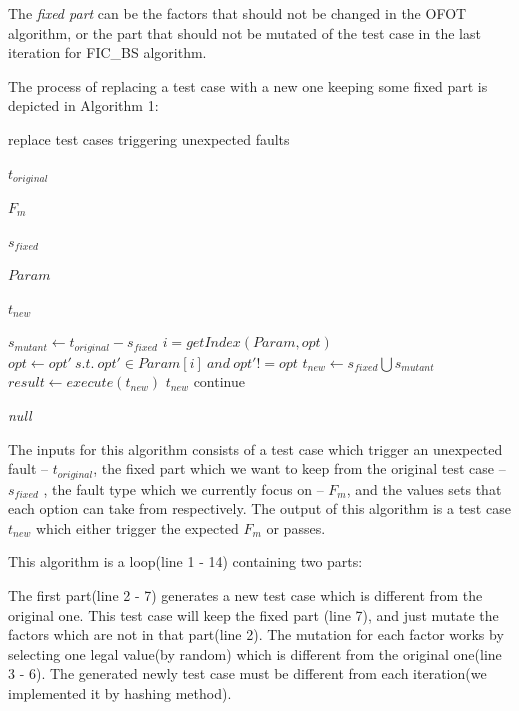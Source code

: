 \documentclass{sig-alternate}
\begin{document}
The \emph{fixed part} can be the factors that should not be changed in the OFOT algorithm, or the part that should not be mutated of the test case in the last iteration for FIC\_BS algorithm.

The process of replacing a test case with a new one keeping some fixed part is depicted in Algorithm 1:

\begin{algorithm}
  \caption{replace test cases triggering unexpected faults}
  \begin{algorithmic}[1]
     \Require

     $t_{original}$ 

     $F_{m}$ 

     $s_{fixed}$ 

     $Param$ 


     \Ensure  $t_{new}$ 

       \State $s_{mutant} \leftarrow t_{original} - s_{fixed}$
          \State $i = getIndex(Param,opt) $
          \State $opt \leftarrow opt' \ s.t.\ opt' \in Param[i]\ and\ opt' != opt$
       \EndFor
       \State $t_{new} \leftarrow s_{fixed} \bigcup s_{mutant} $
       \State $result \leftarrow execute(t_{new})$
         \State \Return $t_{new}$
       \Else
         \State continue
       \EndIf
     \EndWhile

     \State \Return \emph{null}
  \end{algorithmic}
\end{algorithm}

The inputs for this algorithm consists of a test case which trigger an unexpected fault -- $t_{original}$, the fixed part which we want to keep from the original test case -- $s_{fixed}$ , the fault type which we currently focus on -- $F_{m}$, and the values sets that each option can take from respectively.  The output of this algorithm is a test case $t_{new}$ which either trigger the expected $F_{m}$ or passes.

This algorithm is a loop(line 1 - 14) containing two parts:

The first part(line 2 - 7) generates a new test case which is different from the original one. This test case will keep the fixed part (line 7), and just mutate the factors which are not in that part(line 2). The mutation for each factor works by selecting one legal value(by random) which is different from the original one(line 3 - 6). The generated newly test case must be different from each iteration(we implemented it by hashing method).
\end{document}
